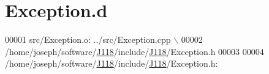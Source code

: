 \hypertarget{_exception_8d_source}{}\section{Exception.\+d}
\label{_exception_8d_source}

\begin{DoxyCode}
00001 src/Exception.o: ../src/Exception.cpp \(\backslash\)
00002  /home/joseph/software/\hyperlink{namespace_j118}{J118}/include/\hyperlink{namespace_j118}{J118}/Exception.h
00003 
00004 /home/joseph/software/\hyperlink{namespace_j118}{J118}/include/\hyperlink{namespace_j118}{J118}/Exception.h:
\end{DoxyCode}
